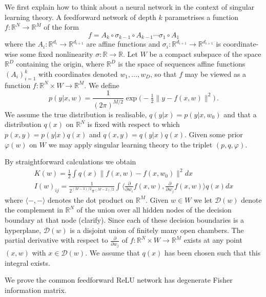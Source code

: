 \documentclass{article} %
\def\lto{\longrightarrow}
\begin{document}
We first explain how to think about a neural network in the context of singular learning theory. A feedforward network of depth $k$ parametrises a function $f: \mathbb{R}^N \lto \mathbb{R}^M$ of the form
\[
f = A_k \circ \sigma_{k-1} \circ A_{k-1} \cdots \sigma_1 \circ A_1
\]
where the $A_i: \mathbb{R}^{d_i} \lto \mathbb{R}^{d_{i+1}}$ are affine functions and $\sigma_i: \mathbb{R}^{d_{i+1}} \lto \mathbb{R}^{d_{i+1}}$ is coordinate-wise some fixed nonlinearity $\sigma: \mathbb{R} \lto \mathbb{R}$. Let $W$ be a compact subspace of the space $\mathbb{R}^D$ containing the origin, where $\mathbb{R}^D$ is the space of sequences affine functions $(A_i)_{i=1}^k$ with coordinates denoted $w_1,\ldots,w_D$, so that $f$ may be viewed as a function $f: \mathbb{R}^N \times W \lto \mathbb{R}^M$. We define
\begin{equation}
p(y|x,w) = \frac{1}{(2 \pi)^{M/2}} \exp\Big(-\tfrac{1}{2} \| y - f(x,w) \|^2 \Big)\,.
\label{eq:gaussian_model_in_w}
\end{equation}
We assume the true distribution is realisable, $q(y|x) = p(y|x,w_0)$ and that a distribution $q(x)$ on $\mathbb{R}^N$ is fixed with respect to which $p(x,y) = p(y|x)q(x)$ and $q(x,y) = q(y|x)q(x)$. Given some prior $\varphi(w)$ on $W$ we may apply singular learning theory to the triplet $(p,q,\varphi)$.

By straightforward calculations we obtain
\begin{gather}
K(w) = \tfrac{1}{2} \int q(x) \| f(x,w) - f(x,w_0) \|^2 dx\\
I(w)_{ij} = \frac{1}{2^{(M-3)/2} \pi^{(M-2)/2}} \int \Big\langle \tfrac{\partial}{\partial w_i} f(x,w), \tfrac{\partial}{\partial w_j} f(x,w) \Big\rangle q(x) dx\label{eq:fisher_relu}
\end{gather}
where $\langle -, - \rangle$ denotes the dot product on $\mathbb{R}^M$. Given $w \in W$ we let $\mathcal{D}(w)$ denote the complement in $\mathbb{R}^N$ of the union over all hidden nodes of the decision boundary at that node (clarify). Since each of these decision boundaries is a hyperplane, $\mathcal{D}(w)$ is a disjoint union of finitely many open chambers. The partial derivative with respect to $\frac{\partial}{\partial w_j}$ of $f: \mathbb{R}^N \times W \lto \mathbb{R}^M$ exists at any point $(x,w)$ with $x \in \mathcal{D}(w)$. We assume that $q(x)$ has been chosen such that this integral exists.

We prove the common feedforward ReLU network has degenerate Fisher information matrix. 
\end{document}
